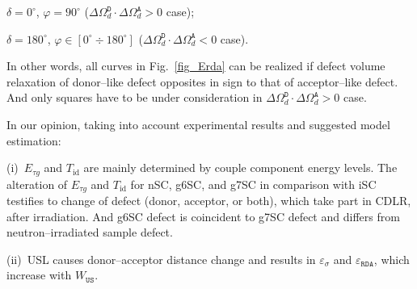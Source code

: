\documentclass[aip,jap, amsmath,amssymb,reprint]{revtex4-1}
\begin{document}

\noindent  $\delta=0^\circ$, $\varphi=90^\circ$ ($\Delta\Omega_d^\mathtt{D}\cdot\Delta\Omega_d^\mathtt{A}>0$ case);

\noindent  $\delta=180^\circ$, $\varphi\in[0^\circ\div 180^\circ]$ ($\Delta\Omega_d^\mathtt{D}\cdot\Delta\Omega_d^\mathtt{A}<0$ case).

\noindent
In other words, all curves in Fig.~\ref{fig_Erda} can be realized if defect volume relaxation of donor--like defect opposites in sign to that of acceptor--like defect.
And only squares have to be under consideration in $\Delta\Omega_d^\mathtt{D}\cdot\Delta\Omega_d^\mathtt{A}>0$ case.

In our opinion, taking into account experimental results and suggested model estimation:

\noindent
(i)~$E_{\tau g}$ and $T_{\mathrm{id}}$ are mainly determined by couple component energy levels.
The alteration of $E_{\tau g}$ and $T_{\mathrm{id}}$ for nSC, g6SC, and g7SC in comparison with iSC testifies to change of defect (donor, acceptor, or both),
which take part in CDLR, after irradiation.
And g6SC defect is coincident to g7SC defect and differs from neutron--irradiated sample defect.

\noindent
(ii)~USL causes donor--acceptor distance change and results in $\varepsilon_{\sigma}$ and $\varepsilon_{\mathtt{RDA}}$,
which increase with $W_{\mathtt{US}}$.
\end{document}
